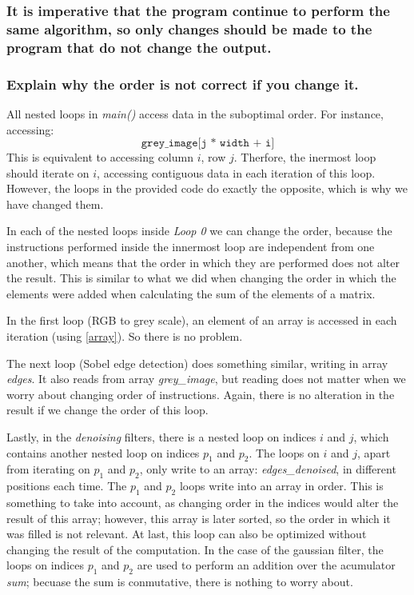 \documentclass{article}
\newcommand{\subquestion}[1]{\subsubsection{#1}}
\begin{document}
    \subquestion{It is imperative that the program continue to perform the same algorithm, so only changes should be made to the program that do not change the output.}
            
    \subquestion{Explain why the order is not correct if you change it.}
    
All nested loops in \emph{main()} access data in the suboptimal order. For instance, accessing: 
\begin{equation}\label{array}
    \texttt{grey\_image[j * width + i]}
\end{equation}
This is equivalent to accessing column $i$, row $j$. Therfore, the inermost loop should iterate on $i$, accessing contiguous data in each iteration of this loop. However, the loops in the provided code do exactly the opposite, which is why we have changed them. 

In each of the nested loops inside \emph{Loop 0} we can change the order, because the instructions performed inside the innermost loop are independent from one another, which means that the order in which they are performed does not alter the result. This is similar to what we did when changing the order in which the elements were added when calculating the sum of the elements of a matrix.

In the first loop (RGB to grey scale), an element of an array is accessed in each iteration (using \ref{array}). So there is no problem.

The next loop (Sobel edge detection) does something similar, writing in array \emph{edges}. It also reads from array \emph{grey\_image}, but reading does not matter when we worry about changing order of instructions. Again, there is no alteration in the result if we change the order of this loop.

Lastly, in the \emph{denoising} filters, there is a nested loop on indices $i$ and $j$, which contains another nested loop on indices $p_1$ and $p_2$. The loops on $i$ and $j$, apart from iterating on $p_1$ and $p_2$, only write to an array: \emph{edges\_denoised}, in different positions each time. The $p_1$ and $p_2$ loops write into an array in order. This is something to take into account, as changing order in the indices would alter the result of this array; however, this array is later sorted, so the order in which it was filled is not relevant. At last, this loop can also be optimized without changing the result of the computation. In the case of the gaussian filter, the loops on indices $p_1$ and $p_2$ are used to perform an addition over the acumulator \emph{sum}; becuase the sum is conmutative, there is nothing to worry about. 
\end{document}
